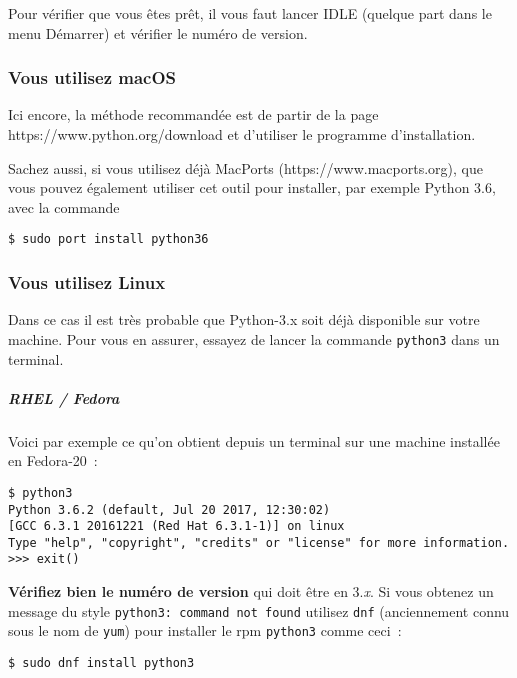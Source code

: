 Pour vérifier que vous êtes prêt, il vous faut lancer IDLE (quelque part
dans le menu Démarrer) et vérifier le numéro de version.

    \hypertarget{vous-utilisez-macos}{%
\subsubsection{Vous utilisez macOS}\label{vous-utilisez-macos}}

    Ici encore, la méthode recommandée est de partir de la page
https://www.python.org/download et d'utiliser le programme
d'installation.

Sachez aussi, si vous utilisez déjà MacPorts (https://www.macports.org),
que vous pouvez également utiliser cet outil pour installer, par exemple
Python 3.6, avec la commande

    \begin{verbatim}
$ sudo port install python36
\end{verbatim}

    \hypertarget{vous-utilisez-linux}{%
\subsubsection{Vous utilisez Linux}\label{vous-utilisez-linux}}

    Dans ce cas il est très probable que Python-3.x soit déjà disponible sur
votre machine. Pour vous en assurer, essayez de lancer la commande
\texttt{python3} dans un terminal.

    \hypertarget{rhel-fedora}{%
\subparagraph{RHEL / Fedora}\label{rhel-fedora}}

    Voici par exemple ce qu'on obtient depuis un terminal sur une machine
installée en Fedora-20~:

    \begin{verbatim}
$ python3
Python 3.6.2 (default, Jul 20 2017, 12:30:02)
[GCC 6.3.1 20161221 (Red Hat 6.3.1-1)] on linux
Type "help", "copyright", "credits" or "license" for more information.
>>> exit()
\end{verbatim}

    \textbf{Vérifiez bien le numéro de version} qui doit être en 3.\emph{x}.
Si vous obtenez un message du style
\texttt{python3:\ command\ not\ found} utilisez \texttt{dnf}
(anciennement connu sous le nom de \texttt{yum}) pour installer le rpm
\texttt{python3} comme ceci~:

    \begin{verbatim}
$ sudo dnf install python3
\end{verbatim}

